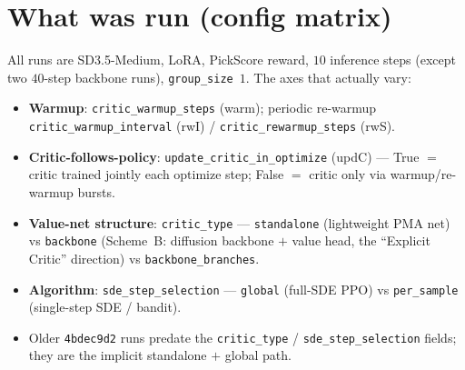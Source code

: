 \documentclass[11pt]{article}
\newcommand{\code}[1]{\texttt{#1}}
\begin{document}
\tableofcontents

\section{What was run (config matrix)}
\label{sec:matrix}

All runs are SD3.5-Medium, LoRA, PickScore reward, $10$ inference steps (except two
$40$-step backbone runs), \code{group\_size}~$1$. The axes that actually vary:
\begin{itemize}[leftmargin=1.5em,itemsep=1pt]
  \item \textbf{Warmup}: \code{critic\_warmup\_steps} (warm); periodic re-warmup
  \code{critic\_warmup\_interval} (rwI) / \code{critic\_rewarmup\_steps} (rwS).
  \item \textbf{Critic-follows-policy}: \code{update\_critic\_in\_optimize} (updC) ---
  True $=$ critic trained jointly each optimize step; False $=$ critic only via
  warmup/re-warmup bursts.
  \item \textbf{Value-net structure}: \code{critic\_type} --- \code{standalone}
  (lightweight PMA net) vs \code{backbone} (Scheme~B: diffusion backbone $+$ value head,
  the ``Explicit Critic'' direction) vs \code{backbone\_branches}.
  \item \textbf{Algorithm}: \code{sde\_step\_selection} --- \code{global} (full-SDE PPO)
  vs \code{per\_sample} (single-step SDE / bandit).
  \item Older \code{4bdec9d2} runs predate the \code{critic\_type} /
  \code{sde\_step\_selection} fields; they are the implicit standalone $+$ global path.
\end{itemize}
\end{document}

